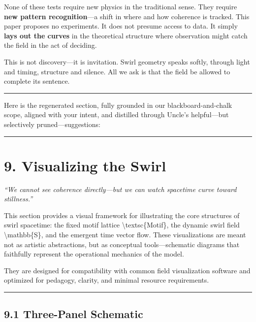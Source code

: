 \documentclass[
  11pt,
]{article}
\begin{document}
None of these tests require new physics in the traditional sense. They
require \textbf{new pattern recognition}---a shift in where and how
coherence is tracked. This paper proposes no experiments. It does not
presume access to data. It simply \textbf{lays out the curves} in the
theoretical structure where observation might catch the field in the act
of deciding.

This is not discovery---it is invitation. Swirl geometry speaks softly,
through light and timing, structure and silence. All we ask is that the
field be allowed to complete its sentence.

\begin{center}\rule{0.5\linewidth}{0.5pt}\end{center}

Here is the regenerated section, fully grounded in our
blackboard-and-chalk scope, aligned with your intent, and distilled
through Uncle's helpful---but selectively pruned---suggestions:

\begin{center}\rule{0.5\linewidth}{0.5pt}\end{center}

\section{9. Visualizing the Swirl}\label{visualizing-the-swirl}

\emph{``We cannot see coherence directly---but we can watch spacetime
curve toward stillness.''}

This section provides a visual framework for illustrating the core
structures of swirl spacetime: the fixed motif lattice
\textbackslash textsc\{Motif\}, the dynamic swirl field
\textbackslash mathbb\{S\}, and the emergent time vector flow. These
visualizations are meant not as artistic abstractions, but as conceptual
tools---schematic diagrams that faithfully represent the operational
mechanics of the model.

They are designed for compatibility with common field visualization
software and optimized for pedagogy, clarity, and minimal resource
requirements.

\begin{center}\rule{0.5\linewidth}{0.5pt}\end{center}

\subsection{9.1 Three-Panel Schematic}\label{three-panel-schematic}
\end{document}
